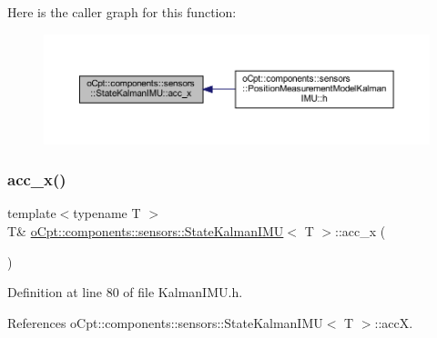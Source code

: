 Here is the caller graph for this function\+:
\nopagebreak
\begin{figure}[H]
\begin{center}
\leavevmode
\includegraphics[width=350pt]{classo_cpt_1_1components_1_1sensors_1_1_state_kalman_i_m_u_a3d94faa4400f2fb4646140ee09590eca_icgraph}
\end{center}
\end{figure}
\hypertarget{classo_cpt_1_1components_1_1sensors_1_1_state_kalman_i_m_u_a3ef88a9cd5d04fa058e48ac059758510}{}\label{classo_cpt_1_1components_1_1sensors_1_1_state_kalman_i_m_u_a3ef88a9cd5d04fa058e48ac059758510} 
\subsubsection{\texorpdfstring{acc\+\_\+x()}{acc\_x()}\hspace{0.1cm}{\footnotesize\ttfamily [2/2]}}
{\footnotesize\ttfamily template$<$typename T $>$ \\
T\& \hyperlink{classo_cpt_1_1components_1_1sensors_1_1_state_kalman_i_m_u}{o\+Cpt\+::components\+::sensors\+::\+State\+Kalman\+I\+MU}$<$ T $>$\+::acc\+\_\+x (\begin{DoxyParamCaption}{ }\end{DoxyParamCaption})\hspace{0.3cm}{\ttfamily [inline]}}



Definition at line 80 of file Kalman\+I\+M\+U.\+h.



References o\+Cpt\+::components\+::sensors\+::\+State\+Kalman\+I\+M\+U$<$ T $>$\+::accX.

\hypertarget{classo_cpt_1_1components_1_1sensors_1_1_state_kalman_i_m_u_abe4adf42c8c10cfd93c64732746de174}{}\label{classo_cpt_1_1components_1_1sensors_1_1_state_kalman_i_m_u_abe4adf42c8c10cfd93c64732746de174} 
